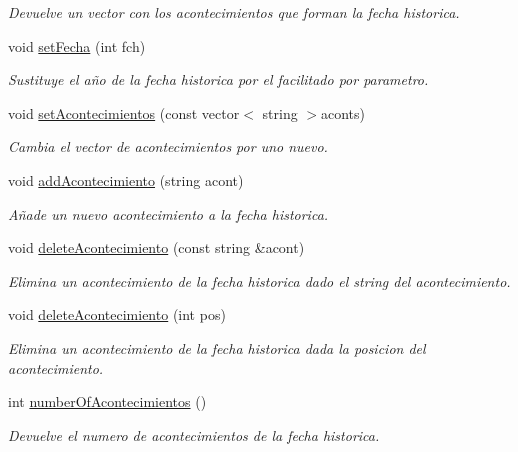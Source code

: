 \begin{DoxyCompactItemize}
\begin{DoxyCompactList}\small\item\em Devuelve un vector con los acontecimientos que forman la fecha historica. \end{DoxyCompactList}\item 
void \hyperlink{classfechahistorica_adf9854b82d74c843d8dcfba77942148b}{set\+Fecha} (int fch)
\begin{DoxyCompactList}\small\item\em Sustituye el año de la fecha historica por el facilitado por parametro. \end{DoxyCompactList}\item 
void \hyperlink{classfechahistorica_a176ab263b446b4854c0196cf16d6900e}{set\+Acontecimientos} (const vector$<$ string $>$aconts)
\begin{DoxyCompactList}\small\item\em Cambia el vector de acontecimientos por uno nuevo. \end{DoxyCompactList}\item 
void \hyperlink{classfechahistorica_acd03970e1906146ea382617ace312275}{add\+Acontecimiento} (string acont)
\begin{DoxyCompactList}\small\item\em Añade un nuevo acontecimiento a la fecha historica. \end{DoxyCompactList}\item 
void \hyperlink{classfechahistorica_ae941dcb14a89645d51791e2ae62f60aa}{delete\+Acontecimiento} (const string \&acont)
\begin{DoxyCompactList}\small\item\em Elimina un acontecimiento de la fecha historica dado el string del acontecimiento. \end{DoxyCompactList}\item 
void \hyperlink{classfechahistorica_ad78b4b054bdb9080e5d15dd452071f0e}{delete\+Acontecimiento} (int pos)
\begin{DoxyCompactList}\small\item\em Elimina un acontecimiento de la fecha historica dada la posicion del acontecimiento. \end{DoxyCompactList}\item 
int \hyperlink{classfechahistorica_ab1d73ae6d9142c24533543ce392403b9}{number\+Of\+Acontecimientos} ()
\begin{DoxyCompactList}\small\item\em Devuelve el numero de acontecimientos de la fecha historica. \end{DoxyCompactList}\item 

\end{DoxyCompactItemize}
